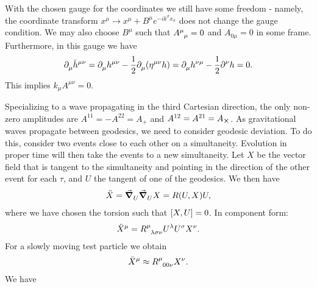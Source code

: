With the chosen gauge for the coordinates we still have some freedom - namely, the coordinate transform $x^{\mu} \to x^{\mu} + B^{\mu}e^{-ik^{\sigma}x_{\sigma}}$ does not change the gauge condition. We may also choose $B^{\mu}$ such that $\tensor{A}{^{\mu}_{\mu}} = 0$ and $A_{0\mu} = 0$ in some frame. Furthermore, in this gauge we have
\begin{align*}
	\del{\mu}{\bar{h}^{\mu\nu}} = \del{\mu}{h^{\mu\nu}} - \frac{1}{2}\del{\mu}{(\eta^{\mu\nu}h)} = \del{\mu}{h^{\nu\mu}} - \frac{1}{2}\del[\nu]{}{h} = 0.
\end{align*}
This implies $k_{\mu}A^{\mu\nu} = 0$.

Specializing to a wave propagating in the third Cartesian direction, the only non-zero amplitudes are $A^{11} = -A^{22} = A_{+}$ and $A^{12} = A^{21} = A_{\cross}$. As gravitational waves propagate between geodesics, we need to consider geodesic deviation. To do this, consider two events close to each other on a simultaneity. Evolution in proper time will then take the events to a new simultaneity. Let $X$ be the vector field that is tangent to the simultaneity and pointing in the direction of the other event for each $\tau$, and $U$ the tangent of one of the geodesics. We then have
\begin{align*}
	\ddot{X} = \dcov{U}{\dcov{U}{X}} = R(U, X)U,
\end{align*}
where we have chosen the torsion such that $\comm{X}{U} = 0$. In component form:
\begin{align*}
	\ddot{X}^{\mu} = \tensor{R}{^{\mu}_{\lambda\sigma\nu}}U^{\lambda}U^{\sigma}X^{\nu}.
\end{align*}
For a slowly moving test particle we obtain
\begin{align*}
	\ddot{X}^{\mu} \approx \tensor{R}{^{\mu}_{00\nu}}X^{\nu}.
\end{align*}
We have
